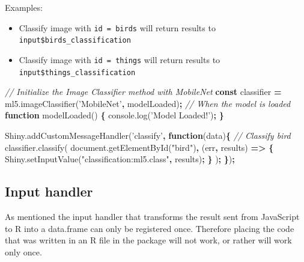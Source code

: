 \documentclass[10pt,]{krantz}
\makeatletter
\newenvironment{Shaded}{\begin{snugshade}}{\end{snugshade}}
\newcommand{\AttributeTok}[1]{\textcolor[rgb]{0.61,0.61,0.61}{#1}}
\newcommand{\CommentTok}[1]{\textcolor[rgb]{0.37,0.37,0.37}{\textit{#1}}}
\newcommand{\KeywordTok}[1]{\textcolor[rgb]{0.27,0.27,0.27}{\textbf{#1}}}
\newcommand{\NormalTok}[1]{#1}
\newcommand{\OperatorTok}[1]{\textcolor[rgb]{0.43,0.43,0.43}{\textbf{#1}}}
\newcommand{\StringTok}[1]{\textcolor[rgb]{0.5,0.5,0.5}{#1}}
\newcommand{\VariableTok}[1]{\textcolor[rgb]{0,0,0}{#1}}
\providecommand{\tightlist}{%
  \setlength{\itemsep}{0pt}\setlength{\parskip}{0pt}}
\newenvironment{kframe}{%
\medskip{}
\setlength{\fboxsep}{.8em}
 \def\at@end@of@kframe{}%
 \ifinner\ifhmode%
  \def\at@end@of@kframe{\end{minipage}}%
  \begin{minipage}{\columnwidth}%
 \fi\fi%
 \def\FrameCommand##1{\hskip\@totalleftmargin \hskip-\fboxsep
 \colorbox{shadecolor}{##1}\hskip-\fboxsep
     \hskip-\linewidth \hskip-\@totalleftmargin \hskip\columnwidth}%
 \MakeFramed {\advance\hsize-\width
   \@totalleftmargin\z@ \linewidth\hsize
   \@setminipage}}%
 {\par\unskip\endMakeFramed%
 \at@end@of@kframe}
\renewenvironment{Shaded}{\begin{kframe}}{\end{kframe}}
\makeatother
\begin{document}
Examples:

\begin{itemize}
\tightlist
\item
  Classify image with \texttt{id\ =\ \textquotesingle{}birds\textquotesingle{}} will return results to \texttt{input\$birds\_classification}
\item
  Classify image with \texttt{id\ =\ \textquotesingle{}things\textquotesingle{}} will return results to \texttt{input\$things\_classification}
\end{itemize}

\begin{Shaded}
\begin{Highlighting}[]
\CommentTok{// Initialize the Image Classifier method with MobileNet}
\KeywordTok{const}\NormalTok{ classifier }\OperatorTok{=} \VariableTok{ml5}\NormalTok{.}\AttributeTok{imageClassifier}\NormalTok{(}\StringTok{'MobileNet'}\OperatorTok{,}\NormalTok{ modelLoaded)}\OperatorTok{;}
\CommentTok{// When the model is loaded}
\KeywordTok{function} \AttributeTok{modelLoaded}\NormalTok{() }\OperatorTok{\{}
  \VariableTok{console}\NormalTok{.}\AttributeTok{log}\NormalTok{(}\StringTok{'Model Loaded!'}\NormalTok{)}\OperatorTok{;}
\OperatorTok{\}}

\VariableTok{Shiny}\NormalTok{.}\AttributeTok{addCustomMessageHandler}\NormalTok{(}\StringTok{'classify'}\OperatorTok{,} \KeywordTok{function}\NormalTok{(data)}\OperatorTok{\{}
  \CommentTok{// Classify bird}
  \VariableTok{classifier}\NormalTok{.}\AttributeTok{classify}\NormalTok{(}
    \VariableTok{document}\NormalTok{.}\AttributeTok{getElementById}\NormalTok{(}\StringTok{"bird"}\NormalTok{)}\OperatorTok{,}\NormalTok{ (err}\OperatorTok{,}\NormalTok{ results) }\KeywordTok{=>} \OperatorTok{\{}
      \VariableTok{Shiny}\NormalTok{.}\AttributeTok{setInputValue}\NormalTok{(}\StringTok{"classification:ml5.class"}\OperatorTok{,}\NormalTok{ results)}\OperatorTok{;}
    \OperatorTok{\}}
\NormalTok{  )}\OperatorTok{;}
\OperatorTok{\}}\NormalTok{)}\OperatorTok{;}
\end{Highlighting}
\end{Shaded}

\hypertarget{shiny-complete-pkg-input-handler}{%
\subsection{Input handler}\label{shiny-complete-pkg-input-handler}}

As mentioned the input handler that transforms the result sent from JavaScript to R into a data.frame can only be registered once. Therefore placing the code that was written in an R file in the package will not work, or rather will work only once.
\end{document}
